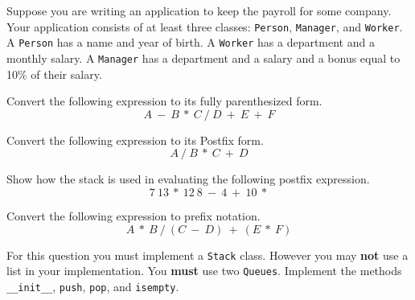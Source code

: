 \documentclass[11pt]{exam}
\begin{document}
\begin{questions}

\question Suppose you are writing an application to keep the payroll for some company.  Your application consists of at least three classes:  \texttt{Person}, \texttt{Manager}, and \texttt{Worker}.  A \texttt{Person}  has a name and year of birth.  A \texttt{Worker} has a department and a monthly salary. A \texttt{Manager} has a department and a salary and a bonus equal to 10\% of their salary.


\newpage

\question[5] Convert the following expression to its fully parenthesized form.
$$A~-~B~*~C~/~D~+~E~+~F$$
\vspace{1.5in}

\question[5] Convert the following expression to its Postfix form.
$$A~/~B~*~C~+~D$$
\vspace{1.5in}

\question[5] Show how the stack is used in evaluating the following postfix expression.
$$7~13~*~12~8~-~4~+~10~*$$
\vspace{1.5in}

\question[5] Convert the following expression to prefix notation.
$$A~*~B~/~(C~-~D)~+~(E~*~F)$$
\vspace{1.5in}


\question[20] For this question you must implement a \texttt{Stack} class.  However you may \textbf{not} use a list in your implementation.  You \textbf{must} use two \texttt{Queues}.  Implement the methods \verb!__init__!, \texttt{push}, \texttt{pop}, and \texttt{isempty}.
\vspace{4.5in}


\end{questions}
\end{document}
